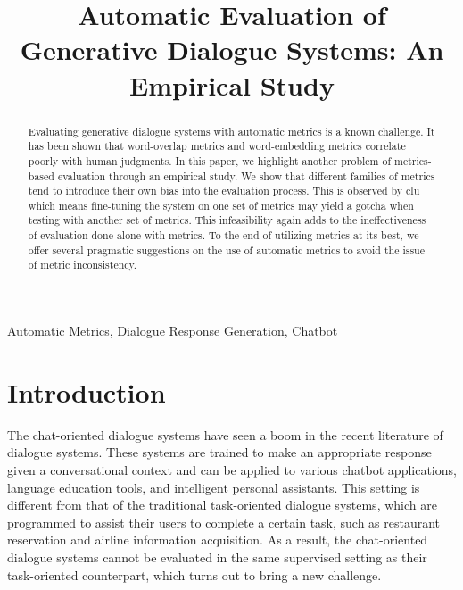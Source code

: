 \documentclass[conference]{IEEEtran}
\begin{document}
\title{Automatic Evaluation of Generative Dialogue Systems: An Empirical Study}

\author{
}

\maketitle

\begin{abstract}
  Evaluating generative dialogue systems with automatic metrics is a known challenge.
  It has been shown that word-overlap metrics and word-embedding metrics correlate poorly with human judgments. 
  In this paper, we highlight another problem of metrics-based evaluation through an empirical study.
  We show that different families of metrics tend to introduce their own bias into the evaluation process. This is observed by clu  which means fine-tuning the system on one set of metrics may yield a gotcha when testing with another set of metrics.
  This infeasibility again adds to the ineffectiveness of evaluation done alone with metrics.
  To the end of utilizing metrics at its best, we offer several pragmatic suggestions
  on the use of automatic metrics to avoid the issue of metric inconsistency.
\end{abstract}

\begin{IEEEkeywords}
Automatic Metrics, Dialogue Response Generation, Chatbot
\end{IEEEkeywords}

\section{Introduction}
The chat-oriented dialogue systems have seen a boom in the recent literature of dialogue systems.
These systems are trained to make an appropriate response given a conversational context and can be applied to various chatbot applications, language education tools, and intelligent personal assistants.
This setting is different from that of the traditional task-oriented dialogue systems, which are programmed to assist their users to complete a certain task, such as restaurant reservation and airline information acquisition.
As a result, the chat-oriented dialogue systems cannot be evaluated in the same supervised setting as their task-oriented counterpart, which turns out to bring a new challenge.
\end{document}
